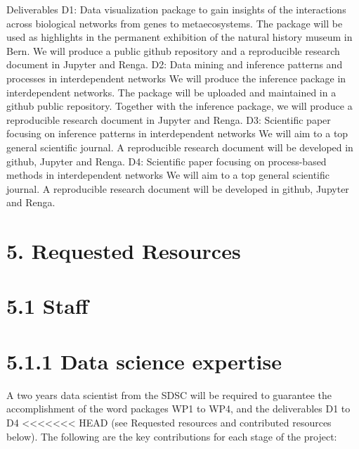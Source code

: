 \documentclass[12pt]{article}
\begin{document}
\begin{center}
Deliverables
D1: Data visualization package to gain insights of the interactions across biological
networks from genes to metaecosystems.
The package will be used as highlights in the permanent exhibition of the natural
history museum in Bern. We will produce a public github repository and a
reproducible research document in Jupyter and Renga.
D2: Data mining and inference patterns and processes in interdependent networks
We will produce the inference package in interdependent networks. The package will
be uploaded and maintained in a github public repository. Together with the inference
package, we will produce a reproducible research document in Jupyter and Renga.
D3: Scientific paper focusing on inference patterns in interdependent networks
We will aim to a top general scientific journal. A reproducible research document
will be developed in github, Jupyter and Renga.
D4: Scientific paper focusing on process-based methods in interdependent networks
We will aim to a top general scientific journal. A reproducible research document
will be developed in github, Jupyter and Renga.

\section*{5. Requested Resources}

\section*{5.1 Staff}

\section*{5.1.1 Data science expertise}
A two years data scientist from the SDSC will be required to guarantee the accomplishment of
the word packages WP1 to WP4, and the deliverables D1 to D4
<<<<<<< HEAD
(see Requested resources and contributed resources below). The following are the key contributions for each stage of the project:


\end{center}
\end{document}
